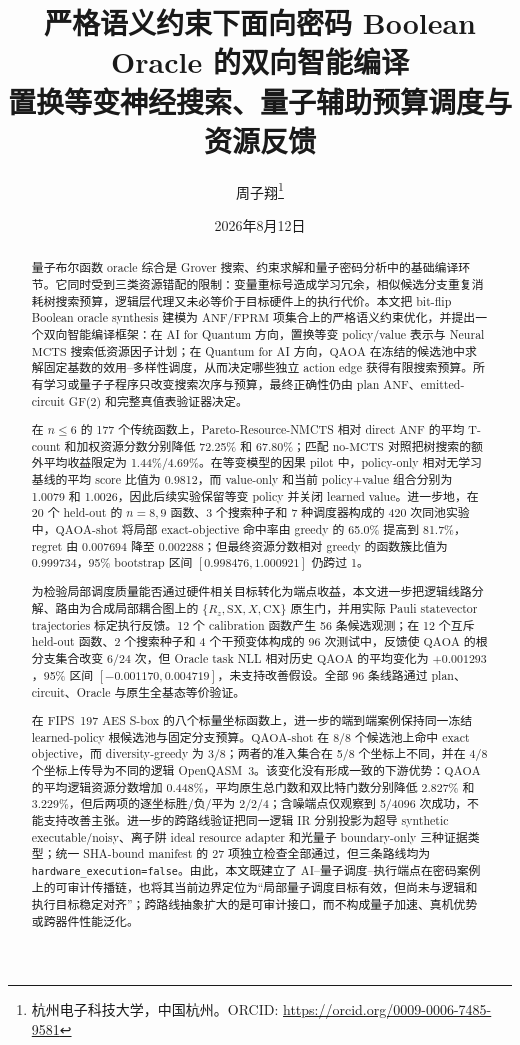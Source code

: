 \documentclass[UTF8,fontset=fandol,11pt]{ctexart}
\title{严格语义约束下面向密码 Boolean Oracle 的双向智能编译\\
\large 置换等变神经搜索、量子辅助预算调度与资源反馈}
\author{周子翔\thanks{杭州电子科技大学，中国杭州。ORCID: \url{https://orcid.org/0009-0006-7485-9581}}}
\date{2026年8月12日}
\newcommand{\method}{Resource-NMCTS}
\newcommand{\anf}{\ensuremath{\mathrm{ANF}}}
\newcommand{\fprm}{\ensuremath{\mathrm{FPRM}}}
\newcommand{\mcts}{\ensuremath{\mathrm{MCTS}}}
\newcommand{\qaoa}{\ensuremath{\mathrm{QAOA}}}
\newcommand{\rz}{\ensuremath{R_z}}
\begin{document}
\pagestyle{plain}
\maketitle

\begin{abstract}
量子布尔函数 oracle 综合是 Grover 搜索、约束求解和量子密码分析中的基础编译环节。它同时受到三类资源错配的限制：变量重标号造成学习冗余，相似候选分支重复消耗树搜索预算，逻辑层代理又未必等价于目标硬件上的执行代价。本文把 bit-flip Boolean oracle synthesis 建模为 \anf{}/\fprm{} 项集合上的严格语义约束优化，并提出一个双向智能编译框架：在 AI for Quantum 方向，置换等变 policy/value 表示与 Neural \mcts{} 搜索低资源因子计划；在 Quantum for AI 方向，\qaoa{} 在冻结的候选池中求解固定基数的效用--多样性调度，从而决定哪些独立 action edge 获得有限搜索预算。所有学习或量子子程序只改变搜索次序与预算，最终正确性仍由 plan \anf{}、emitted-circuit GF(2) 和完整真值表验证器决定。

在 $n\leq6$ 的 177 个传统函数上，Pareto-\method{} 相对 direct \anf{} 的平均 T-count 和加权资源分数分别降低 72.25\% 和 67.80\%；匹配 no-\mcts{} 对照把树搜索的额外平均收益限定为 1.44\%/4.69\%。在等变模型的因果 pilot 中，policy-only 相对无学习基线的平均 score 比值为 0.9812，而 value-only 和当前 policy+value 组合分别为 1.0079 和 1.0026，因此后续实验保留等变 policy 并关闭 learned value。进一步地，在 20 个 held-out 的 $n=8,9$ 函数、3 个搜索种子和 7 种调度器构成的 420 次同池实验中，\qaoa{}-shot 将局部 exact-objective 命中率由 greedy 的 65.0\% 提高到 81.7\%，regret 由 0.007694 降至 0.002288；但最终资源分数相对 greedy 的函数簇比值为 0.999734，95\% bootstrap 区间 $[0.998476,1.000921]$ 仍跨过 1。

为检验局部调度质量能否通过硬件相关目标转化为端点收益，本文进一步把逻辑线路分解、路由为合成局部耦合图上的 $\{\rz,\mathrm{SX},X,\mathrm{CX}\}$ 原生门，并用实际 Pauli statevector trajectories 标定执行反馈。12 个 calibration 函数产生 56 条候选观测；在 12 个互斥 held-out 函数、2 个搜索种子和 4 个干预变体构成的 96 次测试中，反馈使 \qaoa{} 的根分支集合改变 6/24 次，但 Oracle task NLL 相对历史 \qaoa{} 的平均变化为 $+0.001293$，95\% 区间 $[-0.001170,0.004719]$，未支持改善假设。全部 96 条线路通过 plan、circuit、Oracle 与原生全基态等价验证。

在 FIPS~197 AES S-box 的八个标量坐标函数上，进一步的端到端案例保持同一冻结 learned-policy 根候选池与固定分支预算。\qaoa{}-shot 在 8/8 个候选池上命中 exact objective，而 diversity-greedy 为 3/8；两者的准入集合在 5/8 个坐标上不同，并在 4/8 个坐标上传导为不同的逻辑 OpenQASM~3。该变化没有形成一致的下游优势：\qaoa{} 的平均逻辑资源分数增加 0.448\%，平均原生总门数和双比特门数分别降低 2.827\% 和 3.229\%，但后两项的逐坐标胜/负/平为 2/2/4；含噪端点仅观察到 5/4096 次成功，不能支持改善主张。进一步的跨路线验证把同一逻辑 IR 分别投影为超导 synthetic executable/noisy、离子阱 ideal resource adapter 和光量子 boundary-only 三种证据类型；统一 SHA-bound manifest 的 27 项独立检查全部通过，但三条路线均为 \texttt{hardware\_execution=false}。由此，本文既建立了 AI--量子调度--执行端点在密码案例上的可审计传播链，也将其当前边界定位为“局部量子调度目标有效，但尚未与逻辑和执行目标稳定对齐”；跨路线抽象扩大的是可审计接口，而不构成量子加速、真机优势或跨器件性能泛化。


\end{abstract}
\end{document}
